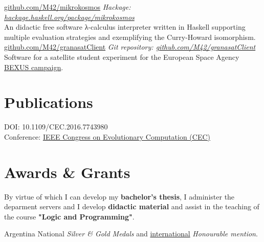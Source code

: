 \documentclass[nocolors]{friggeri-cv-a4}
\begin{document}
\begin{entrylist}
{\href{https://github.com/M42/mikrokosmos}{github.com/M42/mikrokosmos}}
{\emph{Hackage: \href{https://hackage.haskell.org/package/mikrokosmos}{hackage.haskell.org/package/mikrokosmos}} \\
  An didactic free software λ-calculus interpreter written in Haskell supporting multiple evaluation strategies and exemplifying the Curry-Howard isomorphism.
}
{\href{https://github.com/M42/granasatClient}{github.com/M42/granasatClient}}
{\emph{Git repository: \href{https://github.com/M42/granasatClient}{github.com/M42/granasatClient}} \\
  Software for a satellite student experiment for the
  European Space Agency \href{http://rexusbexus.net/}{BEXUS campaign}.
}
\end{entrylist}

\section{Publications}

\begin{entrylist}
  {
    DOI: 10.1109/CEC.2016.7743980 \\
    Conference: \href{http://ieeexplore.ieee.org/document/7743980/2016}{IEEE Congress on Evolutionary Computation (CEC)}
    }
\end{entrylist}

\section{Awards \& Grants}

\begin{entrylist}

  {By virtue of which I can develop my \textbf{bachelor's thesis}, I administer the deparment
    servers and I develop \textbf{didactic material} and assist in the teaching of the course
    \textbf{"Logic and Programming"}.
  }
  
{Argentina}
{National \emph{Silver \& Gold Medals} and
\href{https://www.imo-official.org/team_r.aspx?code=ESP&year=2012}{international} \emph{Honourable mention}.}

\end{entrylist}
\end{document}
